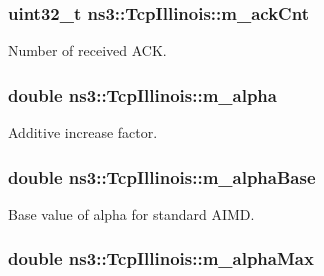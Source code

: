 \subsubsection[{\texorpdfstring{m\+\_\+ack\+Cnt}{m_ackCnt}}]{\setlength{\rightskip}{0pt plus 5cm}uint32\+\_\+t ns3\+::\+Tcp\+Illinois\+::m\+\_\+ack\+Cnt\hspace{0.3cm}{\ttfamily [private]}}\hypertarget{classns3_1_1TcpIllinois_a0f824c49e11b05c4db9a02046e80d850}{}\label{classns3_1_1TcpIllinois_a0f824c49e11b05c4db9a02046e80d850}


Number of received A\+CK. 

\subsubsection[{\texorpdfstring{m\+\_\+alpha}{m_alpha}}]{\setlength{\rightskip}{0pt plus 5cm}double ns3\+::\+Tcp\+Illinois\+::m\+\_\+alpha\hspace{0.3cm}{\ttfamily [private]}}\hypertarget{classns3_1_1TcpIllinois_a7c7f06e3410d0647b6a262c2cef723ba}{}\label{classns3_1_1TcpIllinois_a7c7f06e3410d0647b6a262c2cef723ba}


Additive increase factor. 

\subsubsection[{\texorpdfstring{m\+\_\+alpha\+Base}{m_alphaBase}}]{\setlength{\rightskip}{0pt plus 5cm}double ns3\+::\+Tcp\+Illinois\+::m\+\_\+alpha\+Base\hspace{0.3cm}{\ttfamily [private]}}\hypertarget{classns3_1_1TcpIllinois_a08e136c96d7a6e38606cd0885aa131d7}{}\label{classns3_1_1TcpIllinois_a08e136c96d7a6e38606cd0885aa131d7}


Base value of alpha for standard A\+I\+MD. 

\subsubsection[{\texorpdfstring{m\+\_\+alpha\+Max}{m_alphaMax}}]{\setlength{\rightskip}{0pt plus 5cm}double ns3\+::\+Tcp\+Illinois\+::m\+\_\+alpha\+Max\hspace{0.3cm}{\ttfamily [private]}}\hypertarget{classns3_1_1TcpIllinois_ad9a94e71f8a53c481825f777f1aa6ded}{}\label{classns3_1_1TcpIllinois_ad9a94e71f8a53c481825f777f1aa6ded}


